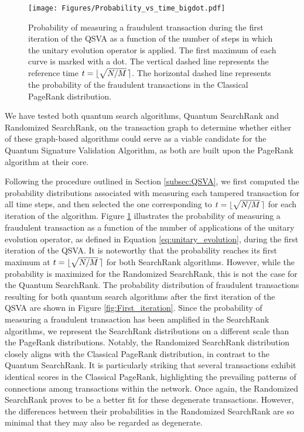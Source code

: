 \documentclass[nofootinbib,aps,prd,reprint,superscriptaddress,floatfix]{revtex4-2}
\begin{document}
\begin{figure}[hbtp]
    \centering
    \texttt{[image: Figures/Probability\_vs\_time\_bigdot.pdf]}
    \caption{Probability of measuring a fraudulent transaction during the first iteration of the QSVA as a function of the number of steps in which the unitary evolution operator is applied. The first maximum of each curve is marked with a dot. The vertical dashed line represents the reference time $t=\lfloor\sqrt{N/M} \hspace{1.5pt}\rceil$. The horizontal dashed line represents the probability of the fraudulent transactions in the Classical PageRank distribution.}
    \label{fig:Time_i_1}
\end{figure}

We have tested both quantum search algorithms, Quantum SearchRank and Randomized SearchRank, on the transaction graph to determine whether either of these graph-based algorithms could serve as a viable candidate for the Quantum Signature Validation Algorithm, as both are built upon the PageRank algorithm at their core. 

Following the procedure outlined in Section \ref{subsec:QSVA}, we first computed the probability distributions associated with measuring each tampered transaction for all time steps, and then selected the one corresponding to $t=\lfloor\sqrt{N/M} \hspace{1.5pt}\rceil$ for each iteration of the algorithm. Figure \ref{fig:Time_i_1} illustrates the probability of measuring a fraudulent transaction as a function of the number of applications of the unitary evolution operator, as defined in Equation \eqref{eq:unitary_evolution}, during the first iteration of the QSVA. It is noteworthy that the probability reaches its first maximum at $t=\lfloor\sqrt{N/M} \hspace{1.5pt}\rceil$ for both SearchRank algorithms. However, while the probability is maximized for the Randomized SearchRank, this is not the case for the Quantum SearchRank. The probability distribution of fraudulent transactions resulting for both quantum search algorithms after the first iteration of the QSVA are shown in Figure \ref{fig:First_iteration}. Since the probability of measuring a fraudulent transaction has been amplified in the SearchRank algorithms, we represent the SearchRank distributions on a different scale than the PageRank distributions. Notably, the Randomized SearchRank distribution closely aligns with the Classical PageRank distribution, in contrast to the Quantum SearchRank. It is particularly striking that several transactions exhibit identical scores in the Classical PageRank, highlighting the prevailing patterns of connections among transactions within the network. Once again, the Randomized SearchRank proves to be a better fit for these degenerate transactions. However, the differences between their probabilities in the Randomized SearchRank are so minimal that they may also be regarded as degenerate.
\end{document}

